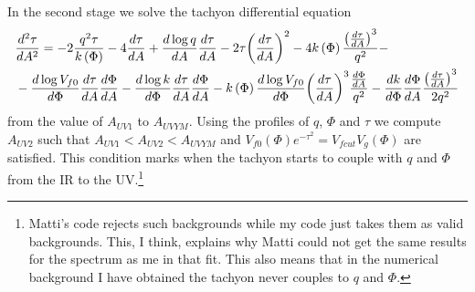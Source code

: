 \documentclass[a4paper,12pt]{article}
\begin{document}
In the second stage we solve the tachyon differential equation
\begin{align}
&\frac{d^2\tau}{d A^2} = - 2 \frac{q^2 \tau}{k\left(\Phi\right)} - 4 \frac{d \tau}{dA} + \frac{d \log q}{dA} \frac{d\tau}{dA} - 2 \tau {\left(\frac{d\tau}{dA}\right)}^2 - 4 k\left(\Phi\right) \frac{{\left( \frac{d\tau}{dA}\right)}^3}{q^2} - \\ \notag
& - \frac{d \log V_{f0}}{d\Phi} \frac{d\tau}{dA} \frac{d\Phi}{dA} - \frac{d \log k}{d\Phi} \frac{d\tau}{dA} \frac{d\Phi}{dA} - k\left(\Phi\right) \frac{d \log V_{f0}}{d\Phi} {\left(\frac{d\tau}{dA}\right)}^3 \frac{\frac{d\Phi}{dA}}{q^2} - \frac{d k}{d\Phi} \frac{d\Phi}{dA} \frac{{\left(\frac{d\tau}{dA}\right)}^3}{2 q^2}
\label{eq: tau YM 2}
\end{align}
from the value of $A_{UV1}$ to $A_{UVYM}$. Using the profiles of $q$, $\Phi$ and $\tau$ we compute $A_{UV2}$ such that $A_{UV1} < A_{UV2} < A_{UVYM}$ and $V_{f0}\left(\Phi\right) e^{-\tau^2} = V_{fcut} V_g \left(\Phi\right)$ are satisfied. This condition marks when the tachyon starts to couple with $q$ and $\Phi$ from the IR to the UV.\footnote{Matti's code rejects such backgrounds while my code just takes them as valid backgrounds. This, I think, explains why Matti could not get the same results for the spectrum as me in that fit. This also means that in the numerical background I have obtained the tachyon never couples to $q$ and $\Phi$. }
\end{document}
